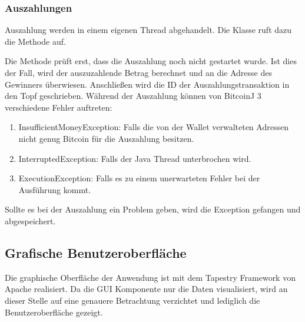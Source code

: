 \subsubsection{Auszahlungen}
Auszahlung werden in einem eigenen Thread abgehandelt. Die Klasse  ruft dazu die  Methode auf.

Die Methode prüft erst, dass die Auszahlung noch nicht gestartet wurde. Ist dies der Fall, wird der auszuzahlende Betrag berechnet und an die Adresse des Gewinners überwiesen. Anschließen wird die ID der Auszahlungstransaktion in den Topf geschrieben. Während der Auszahlung können von BitcoinJ 3 verschiedene Fehler auftreten:
\begin{enumerate}
\item InsufficientMoneyException: Falls die von der Wallet verwalteten Adressen nicht genug Bitcoin für die Auszahlung besitzen.
\item InterruptedException: Falls der Java Thread unterbrochen wird.
\item ExecutionException: Falls es zu einem unerwarteten Fehler bei der Ausführung kommt.
\end{enumerate}
Sollte es bei der Auszahlung ein Problem geben, wird die Exception gefangen und abgespeichert.

\subsection{Grafische Benutzeroberfläche}\label{ssec:btc_gui}

Die graphische Oberfläche der Anwendung ist mit dem Tapestry Framework von Apache realisiert. Da die GUI Komponente nur die Daten visualisiert, wird an dieser Stelle auf eine genauere Betrachtung verzichtet und lediglich die Benutzeroberfläche gezeigt.


